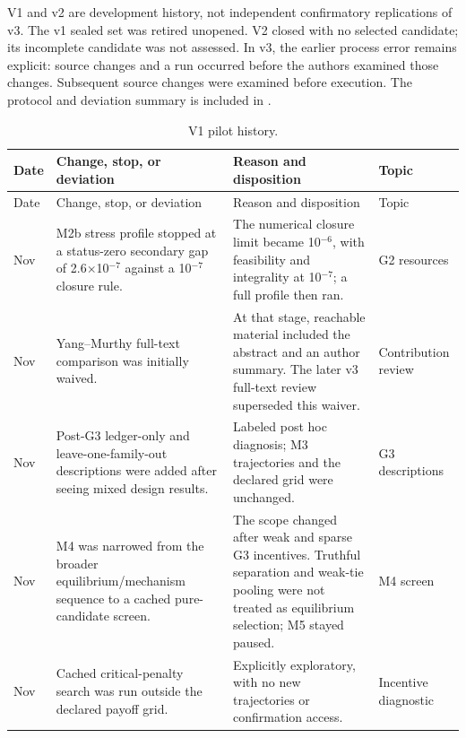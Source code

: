 \documentclass[preprint,11pt,authoryear]{elsarticle}
\begin{document}
V1 and v2 are development history, not independent confirmatory replications of v3. The v1 sealed set was retired unopened. V2 closed with no selected candidate; its incomplete candidate was not assessed. In v3, the earlier process error remains explicit: source changes and a run occurred before the authors examined those changes. Subsequent source changes were examined before execution. The protocol and deviation summary is included in .
\begingroup\small\setlength{\tabcolsep}{4pt}\renewcommand{\arraystretch}{1.18}
\renewcommand{\thetable}{C1}
\begin{longtable}{>{\raggedright\arraybackslash}p{1.1cm}>{\raggedright\arraybackslash}p{4.6cm}>{\raggedright\arraybackslash}p{6.2cm}>{\raggedright\arraybackslash}p{2.7cm}}
\caption{V1 pilot history.}\label{tab:deviations1}\\
\toprule
Date & Change, stop, or deviation & Reason and disposition & Topic \\
\midrule
\endfirsthead
Date & Change, stop, or deviation & Reason and disposition & Topic \\
\midrule
\endhead
\bottomrule\endfoot
12 Nov & M2b stress profile stopped at a status-zero secondary gap of 2.6$\times$10$^{-7}$ against a 10$^{-7}$ closure rule. & The numerical closure limit became 10$^{-6}$, with feasibility and integrality at 10$^{-7}$; a full profile then ran. & G2 resources \\
12 Nov & Yang--Murthy full-text comparison was initially waived. & At that stage, reachable material included the abstract and an author summary. The later v3 full-text review superseded this waiver. & Contribution review \\
12 Nov & Post-G3 ledger-only and leave-one-family-out descriptions were added after seeing mixed design results. & Labeled post hoc diagnosis; M3 trajectories and the declared grid were unchanged. & G3 descriptions \\
12 Nov & M4 was narrowed from the broader equilibrium/mechanism sequence to a cached pure-candidate screen. & The scope changed after weak and sparse G3 incentives. Truthful separation and weak-tie pooling were not treated as equilibrium selection; M5 stayed paused. & M4 screen \\
12 Nov & Cached critical-penalty search was run outside the declared payoff grid. & Explicitly exploratory, with no new trajectories or confirmation access. & Incentive diagnostic \\

\end{longtable}
\end{document}
